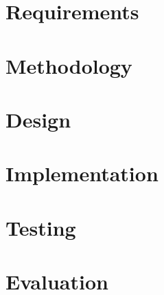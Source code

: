 \documentclass[11pt]{book}
\begin{document}

\chapter{Requirements}

\chapter{Methodology}

\chapter{Design}

\chapter{Implementation}

\chapter{Testing}

\chapter{Evaluation}
\end{document}
